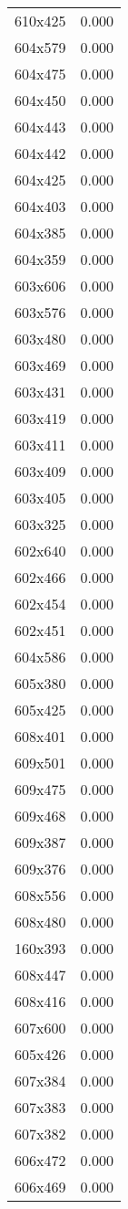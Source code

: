 \begin{table}
\begin{tabular}{lr}
610x425 & 0.000 \\
604x579 & 0.000 \\
604x475 & 0.000 \\
604x450 & 0.000 \\
604x443 & 0.000 \\
604x442 & 0.000 \\
604x425 & 0.000 \\
604x403 & 0.000 \\
604x385 & 0.000 \\
604x359 & 0.000 \\
603x606 & 0.000 \\
603x576 & 0.000 \\
603x480 & 0.000 \\
603x469 & 0.000 \\
603x431 & 0.000 \\
603x419 & 0.000 \\
603x411 & 0.000 \\
603x409 & 0.000 \\
603x405 & 0.000 \\
603x325 & 0.000 \\
602x640 & 0.000 \\
602x466 & 0.000 \\
602x454 & 0.000 \\
602x451 & 0.000 \\
604x586 & 0.000 \\
605x380 & 0.000 \\
605x425 & 0.000 \\
608x401 & 0.000 \\
609x501 & 0.000 \\
609x475 & 0.000 \\
609x468 & 0.000 \\
609x387 & 0.000 \\
609x376 & 0.000 \\
608x556 & 0.000 \\
608x480 & 0.000 \\
160x393 & 0.000 \\
608x447 & 0.000 \\
608x416 & 0.000 \\
607x600 & 0.000 \\
605x426 & 0.000 \\
607x384 & 0.000 \\
607x383 & 0.000 \\
607x382 & 0.000 \\
606x472 & 0.000 \\
606x469 & 0.000 \\

\end{tabular}
\end{table}
